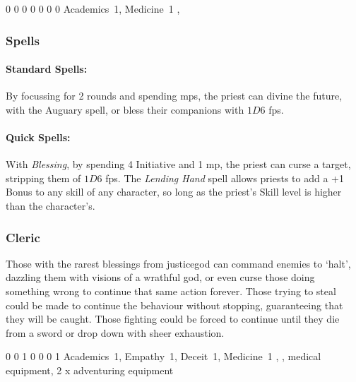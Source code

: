 {\begin{multicols}{2}
{0}%
{0}%
{{0}%
{0}%
{0}}%
{0}%
{0}%
{Academics~1, Medicine~1}%
{\quarterstaff, \partialleather}%
{}


\subsubsection{Spells}

\paragraph{Standard Spells:}

By focussing for 2 rounds and spending \glspl{mp}, the priest can divine the future, with the Auguary spell, or bless their companions with $1D6$ \glspl{fp}.

\paragraph{Quick Spells:}
With \textit{Blessing}, by spending 4 Initiative and 1 \gls{mp}, the priest can curse a target, stripping them of $1D6$ \glspl{fp}.
The \textit{Lending Hand} spell allows priests to add a +1 Bonus to any skill of any character, so long as the priest's Skill level is higher than the character's.

\subsubsection{Cleric}

Those with the rarest blessings from \gls{justicegod} can command enemies to `halt', dazzling them with visions of a wrathful god, or even curse those doing something wrong to continue that same action forever.
Those trying to steal could be made to continue the behaviour without stopping, guaranteeing that they will be caught.
Those fighting could be forced to continue until they die from a sword or drop down with sheer exhaustion.


{0}%
{0}%
{{1}%
{0}%
{0}}%
{0}%
{1}%
{Academics~1, Empathy~1, Deceit~1, Medicine~1}%
{\quarterstaff, \partialchain, medical equipment, 2 x adventuring equipment}%
{\addtocounter{fp}{5}}


\end{multicols}}
